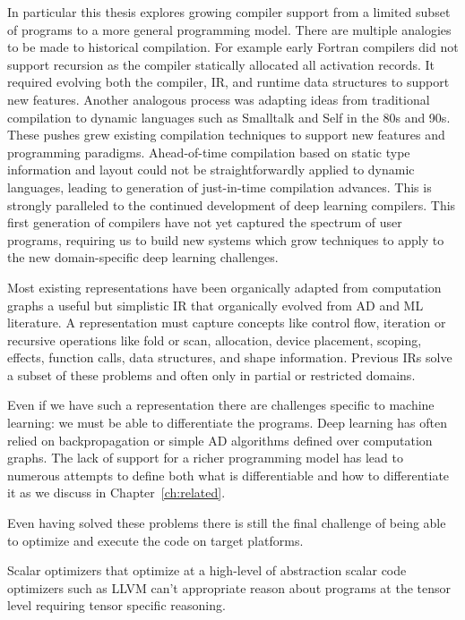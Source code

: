 In particular this thesis explores growing compiler support from
  a limited subset of programs to a more general programming model.
There are multiple analogies to be made to historical compilation.
For example early Fortran compilers did not support recursion
  as the compiler statically allocated all activation records\cite{fortran_recursion}.
It required evolving both the compiler, IR, and runtime data structures
  to support new features.
Another analogous process was adapting ideas from traditional compilation
  to dynamic languages such as Smalltalk and Self in the 80s and 90s.
These pushes grew existing compilation techniques to support new features
  and programming paradigms.
Ahead-of-time compilation based on static type information and layout
  could not be straightforwardly applied to dynamic languages, leading
  to generation of just-in-time compilation advances.
This is strongly paralleled to the continued
  development of deep learning compilers.
This first generation of compilers have not yet
  captured the spectrum of user programs, requiring us to build
  new systems which grow techniques to apply to the new
  domain-specific deep learning challenges.

Most existing representations have been organically adapted from
  computation graphs a useful but simplistic IR that organically
  evolved from AD and ML literature.
A representation must capture concepts like control flow, iteration
  or recursive operations like fold or scan, allocation,
  device placement, scoping, effects, function calls, data structures,
  and shape information.
Previous IRs solve a subset of these problems and often only in partial
  or restricted domains.

Even if we have such a representation there are challenges specific to
 machine learning: we must be able to differentiate the programs.
Deep learning has often relied on backpropagation or simple AD algorithms
  defined over computation graphs.
The lack of support for a richer programming model has lead to numerous
  attempts to define both what is differentiable and how to differentiate
  it as we discuss in Chapter~\ref{ch:related}.

Even having solved these problems there is still the final challenge of being
  able to optimize and execute the code on target platforms.

  Scalar optimizers that optimize at a high-level of abstraction scalar code optimizers such as LLVM can't appropriate reason
  about programs at the tensor level requiring tensor specific reasoning.

